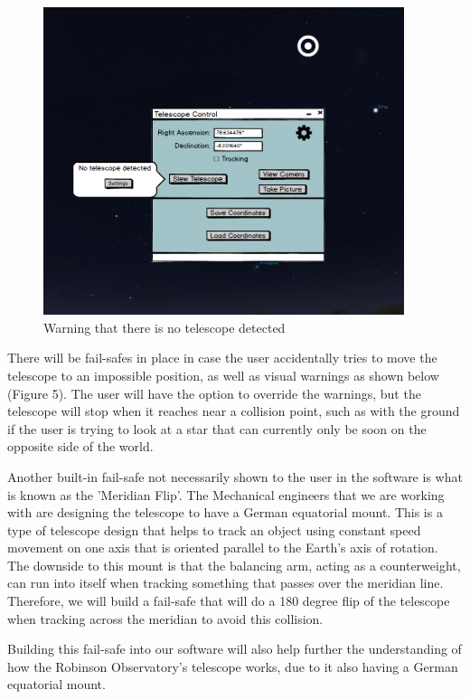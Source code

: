 \documentclass[12pt]{report}
\begin{document}
\newpage


\begin{figure}[h]
	\centering
	\includegraphics[width=0.70\linewidth, height=9cm]{MainScreenNoTelescope}
	\caption{Warning that there is no telescope detected}
\end{figure}

There will be fail-safes in place in case the user accidentally tries to move the telescope to an impossible position, as well as visual warnings as shown below (Figure 5). The user will have the option to override the warnings, but the telescope will stop when it reaches near a collision point, such as with the ground if the user is trying to look at a star that can currently only be soon on the opposite side of the world.

Another built-in fail-safe not necessarily shown to the user in the software is what is known as the 'Meridian Flip'. The Mechanical engineers that we are working with are designing the telescope to have a German equatorial mount. This is a type of telescope design that helps to track an object using constant speed movement on one axis that is oriented parallel to the Earth's axis of rotation. The downside to this mount is that the balancing arm, acting as a counterweight, can run into itself when tracking something that passes over the meridian line. Therefore, we will build a fail-safe that will do a 180 degree flip of the telescope when tracking across the meridian to avoid this collision.

Building this fail-safe into our software will also help further the understanding of how the Robinson Observatory's telescope works, due to it also having a German equatorial mount.
\end{document}

